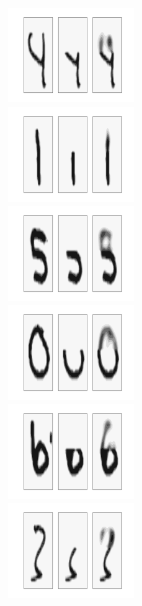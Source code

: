 \documentclass[a4paper,onecolumn]{article}
\theoremstyle{remark}
\begin{document}
\begin{center}
    \includegraphics[width=9cm,height=2.5cm]{png/recon1.png}\\
    \includegraphics[width=9cm,height=2.5cm]{png/recon2.png}\\
    \includegraphics[width=9cm,height=2.5cm]{png/recon3.png}\\
    \includegraphics[width=9cm,height=2.5cm]{png/recon4.png}\\
    \includegraphics[width=9cm,height=2.5cm]{png/recon5.png}\\
    \includegraphics[width=9cm,height=2.5cm]{png/recon6.png}
\end{center}
\end{document}
